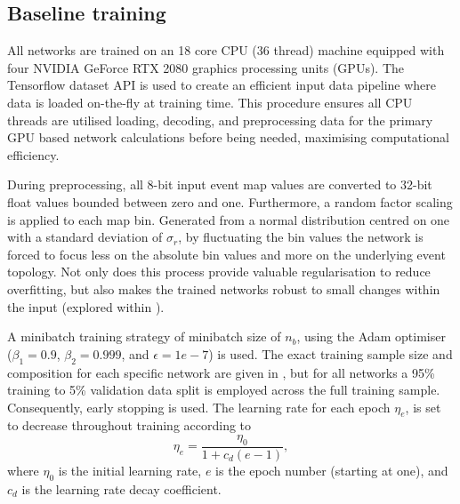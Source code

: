 \subsection{Baseline training} %
\label{sec:cnn_baseline_training} %

All networks are trained on an 18 core CPU (36 thread) machine equipped with four NVIDIA GeForce
RTX 2080 graphics processing units (GPUs). The Tensorflow dataset API is used to create an
efficient input data pipeline where data is loaded on-the-fly at training time. This procedure
ensures all CPU threads are utilised loading, decoding, and preprocessing data for the primary GPU
based network calculations before being needed, maximising computational efficiency.

During preprocessing, all 8-bit input event map values are converted to 32-bit float values
bounded between zero and one. Furthermore, a random factor scaling is applied to each map bin.
Generated from a normal distribution centred on one with a standard deviation of $\sigma_{r}$, by
fluctuating the bin values the network is forced to focus less on the absolute bin values and more
on the underlying event topology. Not only does this process provide valuable regularisation to
reduce overfitting, but also makes the trained networks robust to small changes within the input
(explored within ).

A minibatch training strategy of minibatch size of $n_{b}$, using the Adam
optimiser~\cite{kingma2014} ($\beta_{1}=0.9$, $\beta_{2}=0.999$, and $\epsilon = 1e-7$) is used.
The exact training sample size and composition for each specific network are given in
, but for all networks a 95\% training to 5\% validation data split
is employed across the full training sample. Consequently, early stopping is used. The learning
rate for each epoch $\eta_{e}$, is set to decrease throughout training according to
\begin{equation}
    \eta_{e}=\frac{\eta_{0}}{1+c_{d}(e-1)},
\end{equation}
where $\eta_{0}$ is the initial learning rate, $e$ is the epoch number (starting at one), and
$c_{d}$ is the learning rate decay coefficient.

